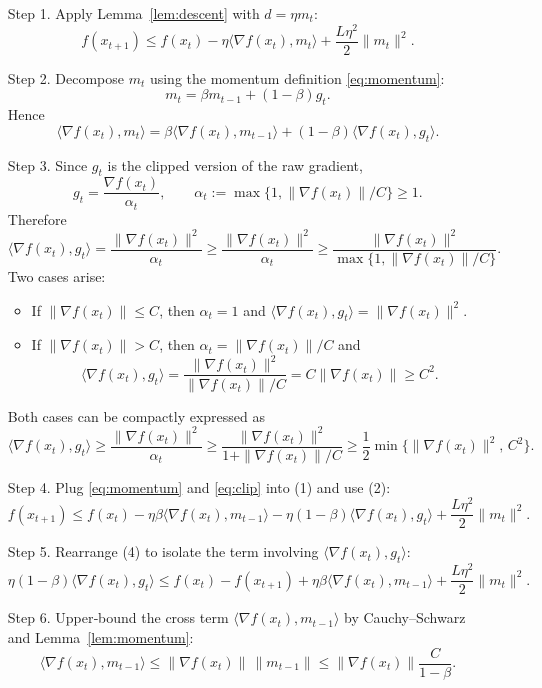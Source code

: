 \documentclass{article}
\begin{document}
\begin{enumerate}
\item[Step 1.] Apply Lemma~\ref{lem:descent} with $d=\eta m_t$:
\[
f(x_{t+1})\le f(x_t)-\eta\langle\nabla f(x_t),m_t\rangle+\frac{L\eta^2}{2}\|m_t\|^2 .\tag{1}
\]

\item[Step 2.] Decompose $m_t$ using the momentum definition \eqref{eq:momentum}:
\[
m_t=\beta m_{t-1}+(1-\beta)g_t .
\]
Hence
\[
\langle\nabla f(x_t),m_t\rangle
=\beta\langle\nabla f(x_t),m_{t-1}\rangle+(1-\beta)\langle\nabla f(x_t),g_t\rangle .\tag{2}
\]

\item[Step 3.] Since $g_t$ is the clipped version of the raw gradient,
\[
g_t = \frac{\nabla f(x_t)}{\alpha_t},\qquad 
\alpha_t:=\max\{1,\|\nabla f(x_t)\|/C\}\ge 1 .
\]
Therefore
\[
\langle\nabla f(x_t),g_t\rangle = \frac{\|\nabla f(x_t)\|^2}{\alpha_t}
\ge \frac{\|\nabla f(x_t)\|^2}{\alpha_t}\ge \frac{\|\nabla f(x_t)\|^2}{\max\{1,\|\nabla f(x_t)\|/C\}} .
\]
Two cases arise:

\begin{itemize}
\item If $\|\nabla f(x_t)\|\le C$, then $\alpha_t=1$ and $\langle\nabla f(x_t),g_t\rangle=\|\nabla f(x_t)\|^2$.
\item If $\|\nabla f(x_t)\|> C$, then $\alpha_t=\|\nabla f(x_t)\|/C$ and
\[
\langle\nabla f(x_t),g_t\rangle = \frac{\|\nabla f(x_t)\|^2}{\|\nabla f(x_t)\|/C}=C\|\nabla f(x_t)\|\ge C^2 .
\]
\end{itemize}
Both cases can be compactly expressed as
\[
\langle\nabla f(x_t),g_t\rangle \ge \frac{\|\nabla f(x_t)\|^2}{\alpha_t}
\ge \frac{\|\nabla f(x_t)\|^2}{1+\|\nabla f(x_t)\|/C}
\ge \frac{1}{2}\min\bigl\{\|\nabla f(x_t)\|^2,\,C^2\bigr\}. \tag{3}
\]

\item[Step 4.] Plug \eqref{eq:momentum} and \eqref{eq:clip} into (1) and use (2):
\[
f(x_{t+1})\le f(x_t)-\eta\beta\langle\nabla f(x_t),m_{t-1}\rangle
-\eta(1-\beta)\langle\nabla f(x_t),g_t\rangle
+\frac{L\eta^2}{2}\|m_t\|^2 .\tag{4}
\]

\item[Step 5.] Rearrange (4) to isolate the term involving $\langle\nabla f(x_t),g_t\rangle$:
\[
\eta(1-\beta)\langle\nabla f(x_t),g_t\rangle
\le f(x_t)-f(x_{t+1})+\eta\beta\langle\nabla f(x_t),m_{t-1}\rangle
+\frac{L\eta^2}{2}\|m_t\|^2 .\tag{5}
\]

\item[Step 6.] Upper‑bound the cross term $\langle\nabla f(x_t),m_{t-1}\rangle$ by Cauchy–Schwarz and Lemma~\ref{lem:momentum}:
\[
\langle\nabla f(x_t),m_{t-1}\rangle\le\|\nabla f(x_t)\|\,\|m_{t-1}\|
\le\|\nabla f(x_t)\|\frac{C}{1-\beta}. \tag{6}
\]


\end{enumerate}
\end{document}
